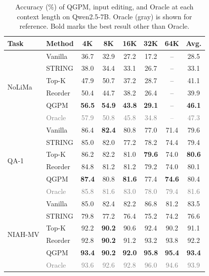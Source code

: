 \documentclass[11pt]{article}
\begin{document}
\begin{table}[t]
\centering
\small
\setlength{\tabcolsep}{2.5pt}
\begin{tabular*}{\columnwidth}{@{\extracolsep{\fill}} ll cccccc @{}}
\toprule
Task & Method & 4K & 8K & 16K & 32K & 64K & Avg. \\
\midrule
\multirow{6}{*}{NoLiMa} & Vanilla & 36.7 & 32.9 & 27.2 & 17.2 & -- & 28.5 \\
 & STRING & 38.0 & 34.4 & 33.1 & 26.7 & -- & 33.1 \\
 & Top-K & 47.9 & 50.7 & 37.2 & 28.7 & -- & 41.1 \\
 & Reorder & 50.4 & 44.7 & 38.2 & 26.4 & -- & 39.9 \\
 & QGPM & \textbf{56.5} & \textbf{54.9} & \textbf{43.8} & \textbf{29.1} & -- & \textbf{46.1} \\
 & \textcolor{gray}{Oracle} & \textcolor{gray}{57.9} & \textcolor{gray}{50.8} & \textcolor{gray}{45.8} & \textcolor{gray}{34.8} & \textcolor{gray}{--} & \textcolor{gray}{47.3} \\
\midrule
\multirow{6}{*}{QA-1} & Vanilla & 86.4 & \textbf{82.4} & 80.8 & 77.0 & 71.4 & 79.6 \\
 & STRING & 85.0 & 82.0 & 77.2 & 78.2 & 74.4 & 79.4 \\
 & Top-K & 86.2 & 82.2 & 81.0 & \textbf{79.6} & 74.0 & \textbf{80.6} \\
 & Reorder & 84.8 & 81.2 & 81.2 & 79.2 & 74.0 & 80.1 \\
 & QGPM & \textbf{87.4} & 80.8 & \textbf{81.6} & 77.4 & \textbf{74.6} & 80.4 \\
 & \textcolor{gray}{Oracle} & \textcolor{gray}{85.8} & \textcolor{gray}{81.6} & \textcolor{gray}{83.0} & \textcolor{gray}{78.0} & \textcolor{gray}{79.4} & \textcolor{gray}{81.6} \\
\midrule
\multirow{6}{*}{NIAH-MV} & Vanilla & 85.0 & 82.4 & 82.2 & 86.8 & 81.2 & 83.5 \\
 & STRING & 79.8 & 77.2 & 76.4 & 75.2 & 74.2 & 76.6 \\
 & Top-K & 92.2 & \textbf{90.2} & 90.6 & 92.4 & 90.2 & 91.1 \\
 & Reorder & 92.8 & \textbf{90.2} & 91.2 & 93.2 & 93.8 & 92.2 \\
 & QGPM & \textbf{93.4} & \textbf{90.2} & \textbf{92.0} & \textbf{95.8} & \textbf{95.4} & \textbf{93.4} \\
 & \textcolor{gray}{Oracle} & \textcolor{gray}{93.6} & \textcolor{gray}{92.6} & \textcolor{gray}{92.8} & \textcolor{gray}{96.0} & \textcolor{gray}{94.6} & \textcolor{gray}{93.9} \\
\bottomrule
\end{tabular*}
\caption{Accuracy (\%) of QGPM, input editing, and Oracle at each context length on Qwen2.5-7B. Oracle (gray) is shown for reference. Bold marks the best result other than Oracle.}
\label{tab:full-ablation}
\end{table}
\end{document}
